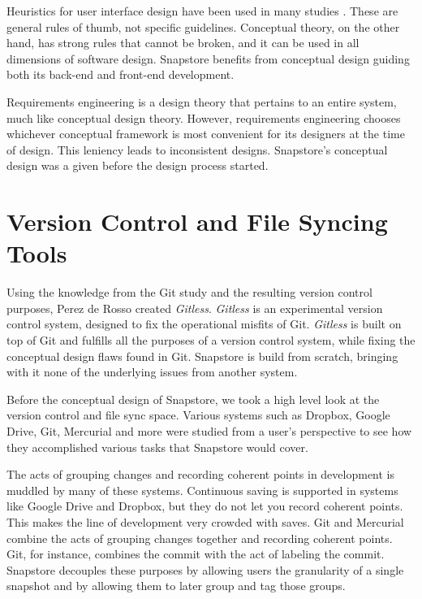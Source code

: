 Heuristics for user interface design have been used in many studies \cite{Nielsen}. These are general rules of thumb, not specific guidelines. Conceptual theory, on the other hand, has strong rules that cannot be broken, and it can be used in all dimensions of software design. Snapstore benefits from conceptual design guiding both its back-end and front-end development.

Requirements engineering \cite{Wieringa} is a design theory that pertains to an entire system, much like conceptual design theory. However, requirements engineering chooses whichever conceptual framework is most convenient for its designers at the time of design. This leniency leads to inconsistent designs. Snapstore's conceptual design was a given before the design process started.

\section{Version Control and File Syncing Tools}

Using the knowledge from the Git study and the resulting version control purposes, Perez de Rosso created \textit{Gitless}. \textit{Gitless} is an experimental version control system, designed to fix the operational misfits of Git. \textit{Gitless} is built on top of Git and fulfills all the purposes of a version control system, while fixing the conceptual design flaws found in Git. Snapstore is build from scratch, bringing with it none of the underlying issues from another system.

Before the conceptual design of Snapstore, we took a high level look at the version control and file sync space. Various systems such as Dropbox, Google Drive, Git, Mercurial and more were studied from a user's perspective to see how they accomplished various tasks that Snapstore would cover.

The acts of grouping changes and recording coherent points in development is muddled by many of these systems. Continuous saving is supported in systems like Google Drive and Dropbox, but they do not let you record coherent points. This makes the line of development very crowded with saves. Git and Mercurial combine the acts of grouping changes together and recording coherent points. Git, for instance, combines the commit with the act of labeling the commit. Snapstore decouples these purposes by allowing users the granularity of a single snapshot and by allowing them to later group and tag those groups.

